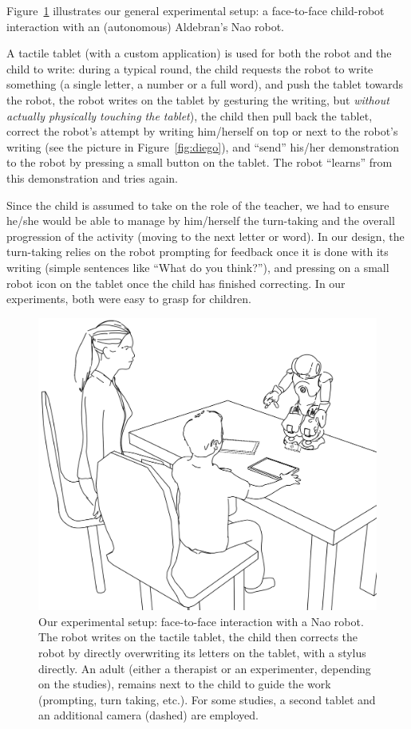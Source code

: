 \documentclass{article}
\begin{document}
Figure~\ref{experimental_setup} illustrates our general experimental setup: a
face-to-face child-robot interaction with an (autonomous) Aldebran's Nao robot.

A tactile tablet (with a custom application) is used for both the robot and the
child to write: during a typical round, the child requests the robot to write
something (a single letter, a number or a full word), and push the tablet
towards the robot, the robot writes on the tablet by gesturing the writing, but
\emph{without actually physically touching the tablet}), the child then pull
back the tablet, correct the robot's attempt by writing him/herself on top or
next to the robot's writing (see the picture in Figure~\ref{fig:diego}), and
``send'' his/her demonstration to the robot by pressing a small button on the
tablet. The robot ``learns'' from this demonstration and tries again.

Since the child is assumed to take on the role of the teacher, we had to ensure
he/she would be able to manage by him/herself the turn-taking and the overall
progression of the activity (moving to the next letter or word). In our design,
the turn-taking relies on the robot prompting for feedback once it is done with
its writing (simple sentences like ``What do you think?''), and pressing on a
small robot icon on the tablet once the child has finished correcting. In our
experiments, both were easy to grasp for children.


\begin{figure}
    \centering
    \includegraphics[width=0.8\linewidth]{experimental_setup}
    \caption{Our experimental setup: face-to-face interaction with a Nao robot.
    The robot writes on the tactile tablet, the child then corrects the robot by
    directly overwriting its letters on the tablet, with a stylus directly. An adult
    (either a therapist or an experimenter, depending on the studies), remains next
    to the child to guide the work (prompting, turn taking, etc.). For some studies, a second tablet and an additional camera (dashed) are employed.}
    \label{experimental_setup}
\end{figure}
\end{document}
